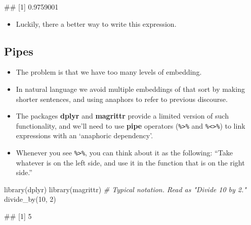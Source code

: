 \documentclass[
]{book}
\newenvironment{Shaded}{\begin{snugshade}}{\end{snugshade}}
\newcommand{\CommentTok}[1]{\textcolor[rgb]{0.56,0.35,0.01}{\textit{#1}}}
\newcommand{\DecValTok}[1]{\textcolor[rgb]{0.00,0.00,0.81}{#1}}
\newcommand{\FunctionTok}[1]{\textcolor[rgb]{0.00,0.00,0.00}{#1}}
\newcommand{\NormalTok}[1]{#1}
\providecommand{\tightlist}{%
  \setlength{\itemsep}{0pt}\setlength{\parskip}{0pt}}
\begin{document}
\begin{Shaded}
\begin{Highlighting}[]
\NormalTok{\#\# [1] 0.9759001}
\end{Highlighting}
\end{Shaded}

\begin{itemize}
\tightlist
\item
  Luckily, there a better way to write this expression.
\end{itemize}

\hypertarget{pipes-1}{%
\subsection{Pipes}\label{pipes-1}}

\begin{itemize}
\tightlist
\item
  The problem is that we have too many levels of embedding.
\item
  In natural language we avoid multiple embeddings of that sort by making shorter sentences, and using anaphors to refer to previous discourse.
\item
  The packages \textbf{dplyr} and \textbf{magrittr} provide a limited version of such functionality, and we'll need to use \textbf{pipe} operators (\texttt{\%\textgreater{}\%} and \texttt{\%\textless{}\textgreater{}\%}) to link expressions with an `anaphoric dependency'.
\item
  Whenever you see \texttt{\%\textgreater{}\%}, you can think about it as the following: ``Take whatever is on the left side, and use it in the function that is on the right side.''
\end{itemize}

\begin{Shaded}
\begin{Highlighting}[]
\FunctionTok{library}\NormalTok{(dplyr)}
\FunctionTok{library}\NormalTok{(magrittr)}
\CommentTok{\# Typical notation. Read as "Divide 10 by 2."}
\FunctionTok{divide\_by}\NormalTok{(}\DecValTok{10}\NormalTok{, }\DecValTok{2}\NormalTok{)}
\end{Highlighting}
\end{Shaded}

\begin{Shaded}
\begin{Highlighting}[]
\NormalTok{\#\# [1] 5}
\end{Highlighting}
\end{Shaded}
\end{document}
